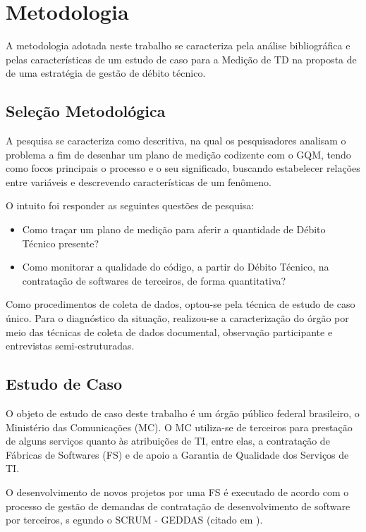 \chapter[Metodologia]{Metodologia}
A metodologia adotada neste trabalho se caracteriza pela análise bibliográfica e
pelas características de um estudo de caso para a Medição de TD na proposta de
de \cite{td} uma estratégia de gestão de débito técnico.

\section{Seleção Metodológica}
A pesquisa se caracteriza como descritiva, na qual os pesquisadores analisam o problema
a fim de desenhar um plano de medição codizente com o GQM, tendo como focos
principais o processo e o seu significado,
buscando estabelecer relações entre variáveis e descrevendo características de
um fenômeno.

O intuito foi responder as seguintes questões de pesquisa:

\begin{itemize}
  \item Como traçar um plano de medição para aferir a quantidade de Débito Técnico
  presente?

  \item Como monitorar a qualidade do código, a partir do Débito Técnico, na
  contratação de softwares de terceiros, de forma quantitativa?
\end{itemize}

Como procedimentos de coleta de dados, optou-se pela técnica de estudo de caso
único. Para o diagnóstico da situação, realizou-se a caracterização do órgão por
meio das técnicas de coleta de dados documental, observação participante e
entrevistas semi-estruturadas.

\section{Estudo de Caso}
O objeto de estudo de caso deste trabalho é um órgão público federal brasileiro,
o Ministério das Comunicações (MC). O MC utiliza-se de terceiros para prestação
de alguns serviços quanto às atribuições de TI, entre elas, a contratação de
Fábricas de Softwares (FS) e de apoio a Garantia de Qualidade dos Serviços de TI.

O desenvolvimento de novos projetos por uma FS é executado de acordo com o processo
de gestão de demandas de contratação de desenvolvimento de software por terceiros, s
egundo o SCRUM - GEDDAS (citado em \cite{souza}).

